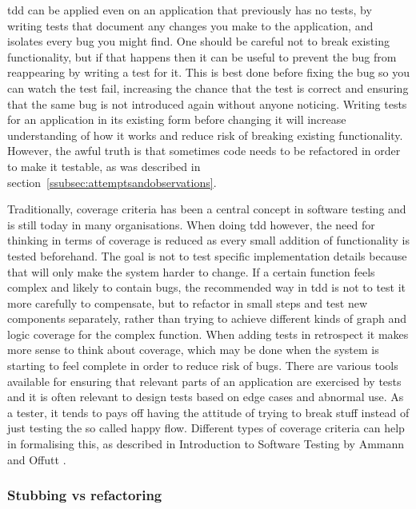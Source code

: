 \documentclass[11pt]{article}
\begin{document}
\gls{tdd} can be applied even on an application that previously has no tests, by writing tests that document any changes you make to the application, and isolates every bug you might find. One should be careful not to break existing functionality, but if that happens then it can be useful to prevent the bug from reappearing by writing a test for it. This is best done before fixing the bug so you can watch the test fail, increasing the chance that the test is correct and ensuring that the same bug is not introduced again without anyone noticing. Writing tests for an application in its existing form before changing it will increase understanding of how it works and reduce risk of breaking existing functionality. However, the awful truth is that sometimes code needs to be refactored in order to make it testable, as was described in section~\ref{ssubsec:attemptsandobservations}.

Traditionally, coverage criteria has been a central concept in software testing and is still today in many organisations. When doing \gls{tdd} however, the need for thinking in terms of coverage is reduced as every small addition of functionality is tested beforehand. The goal is not to test specific implementation details because that will only make the system harder to change. If a certain function feels complex and likely to contain bugs, the recommended way in \gls{tdd} is not to test it more carefully to compensate, but to refactor in small steps and test new components separately, rather than trying to achieve different kinds of graph and logic coverage for the complex function. When adding tests in retrospect it makes more sense to think about coverage, which may be done when the system is starting to feel complete in order to reduce risk of bugs. There are various tools available for ensuring that relevant parts of an application are exercised by tests and it is often relevant to design tests based on edge cases and abnormal use. As a tester, it tends to pays off having the attitude of trying to break stuff instead of just testing the so called happy flow. Different types of coverage criteria can help in formalising this, as described in Introduction to Software Testing by Ammann and Offutt \cite{AmmannOffutt}.

\label{subsec:coveragecriteria}

\subsubsection{Stubbing vs refactoring}
\end{document}

